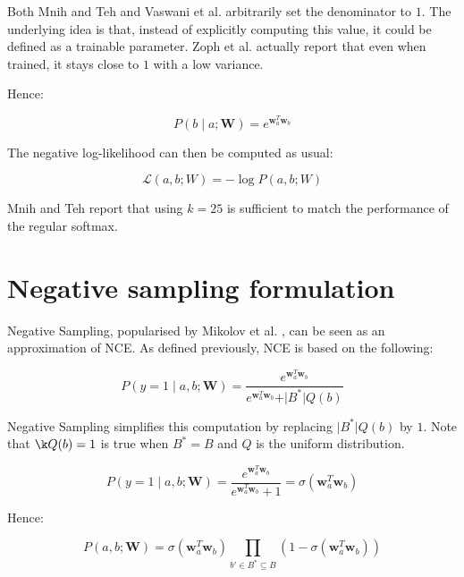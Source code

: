 \documentclass[a4paper,oneside,12pt]{article}
\begin{document}
Both Mnih and Teh \cite{mnih2012fast} and Vaswani et al. \cite{vaswani-etal-2013-decoding} arbitrarily set the denominator to $1$.
The underlying idea is that, instead of explicitly computing this value, it could be defined as a trainable parameter.
Zoph et al. \cite{zoph-fast} actually report that even when trained, it stays close to $1$ with a low variance.

Hence:

\begin{equation}
P(b \mid a ; \mathbf{W}) = e^{\mathbf{w}_a^T \mathbf{w}_b}
\end{equation}

The negative log-likelihood can then be computed as usual:

\begin{equation}
\mathcal{L} (a, b ; W) = -\log P (a, b ; W)
\end{equation}

Mnih and Teh \cite{mnih2012fast} report that using $k = 25$ is sufficient to match the performance of the regular softmax.


\section{Negative sampling formulation}

Negative Sampling, popularised by Mikolov et al. \cite{Mikolov2013DistributedRO}, can be seen as an approximation of NCE.
As defined previously, NCE is based on the following:

\begin{equation}
P(y = 1 \mid a, b ; \mathbf{W}) = \frac{e^{\mathbf{w}_a^T \mathbf{w}_b}}{e^{\mathbf{w}_a^T \mathbf{w}_b} + \vert B^* \vert Q(b)}
\end{equation}

Negative Sampling simplifies this computation by replacing $\vert B^* \vert Q(b)$ by $1$.
Note that $\k Q(b) = 1$ is true when $B^* = B$ and $Q$ is the uniform distribution.

\begin{equation}
P(y = 1 \mid a, b ; \mathbf{W}) = \frac{e^{\mathbf{w}_a^T \mathbf{w}_b}}{e^{\mathbf{w}_a^T \mathbf{w}_b} + 1} = \sigma \left( \mathbf{w}_a^T \mathbf{w}_b \right)
\end{equation}


Hence:

\begin{equation}
P(a, b ; \mathbf{W}) = \sigma \left( \mathbf{w}_a^T \mathbf{w}_b \right) \prod_{b' \in B^* \subseteq B} \left( 1 - \sigma \left( \mathbf{w}_a^T \mathbf{w}_b \right) \right)
\end{equation}
\end{document}
